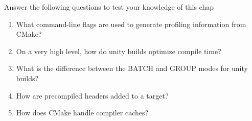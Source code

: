 Answer the following questions to test your knowledge of this chap

\begin{enumerate}
\item 
What command-line flags are used to generate profiling information from CMake?

\item 
On a very high level, how do unity builds optimize compile time?

\item 
What is the difference between the BATCH and GROUP modes for unity builds?

\item 
How are precompiled headers added to a target?

\item 
How does CMake handle compiler caches?
\end{enumerate}